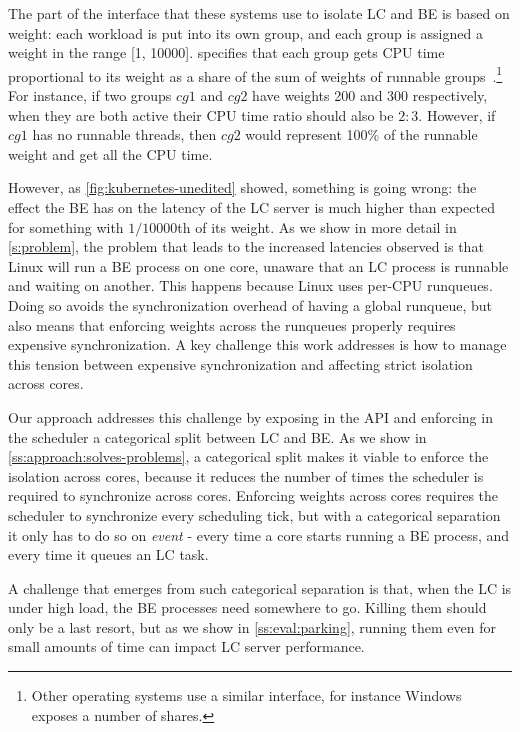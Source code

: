 The part of the \cgroups{} interface that these systems use to isolate LC and BE
is based on weight: each workload is put into its own group, and each group is
assigned a weight in the range [1, 10000]. \cgroups{} specifies that each group
gets CPU time proportional to its weight as a share of the sum of weights of
runnable groups~\cite{cgroups-kerneldocs}.\footnote{Other operating systems use
a similar interface, for instance Windows exposes a number of shares.} For
instance, if two groups $cg1$ and $cg2$ have weights 200 and 300 respectively,
when they are both active their CPU time ratio should also be $2:3$. However, if
$cg1$ has no runnable threads, then $cg2$ would represent 100\% of the runnable
weight and get all the CPU time.

However, as \autoref{fig:kubernetes-unedited} showed, something is going wrong:
the effect the BE has on the latency of the LC server is much higher than
expected for something with $1/10000$th of its weight. As we show in more detail
in \autoref{s:problem}, the problem that leads to the increased latencies
observed is that Linux will run a BE process on one core, unaware that an LC
process is runnable and waiting on another. This happens because Linux uses
per-CPU runqueues. Doing so avoids the synchronization overhead of having a
global runqueue, but also means that enforcing weights across the runqueues
properly requires expensive synchronization. A key challenge this work addresses
is how to manage this tension between expensive synchronization and affecting
strict isolation across cores.

Our approach addresses this challenge by exposing in the API and enforcing in
the scheduler a categorical split between LC and BE. As we show in
\autoref{ss:approach:solves-problems}, a categorical split makes it viable to
enforce the isolation across cores, because it reduces the number of times the
scheduler is required to synchronize across cores. Enforcing weights across
cores requires the scheduler to synchronize every scheduling tick, but with a
categorical separation it only has to do so on \textit{event} - every time a
core starts running a BE process, and every time it queues an LC task.

A challenge that emerges from such categorical separation is that, when the LC
is under high load, the BE processes need somewhere to go. Killing them should
only be a last resort, but as we show in \autoref{ss:eval:parking}, running them
even for small amounts of time can impact LC server performance.

